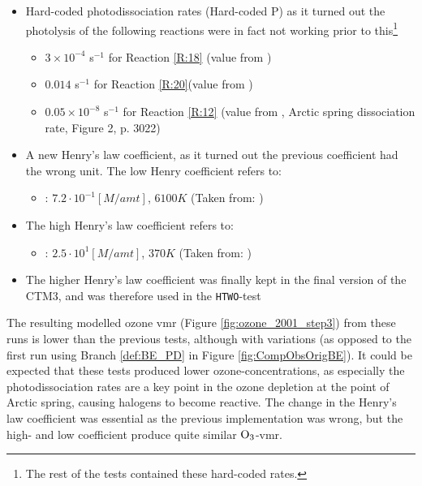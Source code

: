 \begin{itemize}
    \item Hard-coded photodissociation rates (Hard-coded P) as it turned out the photolysis of the following reactions were in fact not working prior to this\footnote{The rest of the tests contained these hard-coded rates. }
    \begin{itemize}
        \item $3\times10^{-4}$ s$^{-1}$ for Reaction \ref{R:18} (value from \cite{CAO})
        \item $0.014$ s$^{-1}$ for Reaction \ref{R:20}(value from \cite{CAO})
        \item $0.05\times10^{-8}$ s$^{-1}$ for Reaction \ref{R:12} (value from \cite{Papanastasiou2013}, Arctic spring dissociation rate, Figure 2, p. 3022)
    \end{itemize}
    
    \item A new Henry's law coefficient, as it turned out the previous coefficient had the wrong unit. The low Henry coefficient refers to:
    \begin{itemize}
        \item {}: $7.2\cdot 10^{-1} [M/amt]$, $6100 K$ (Taken from: \cite{Chameides1992})
    \end{itemize}   
    \item The high Henry's law coefficient refers to: 
    \begin{itemize}
        \item {}: $2.5 \cdot 10^{1} [M/amt]$, $370 K$ (Taken from: \cite{dean1999})
    \end{itemize}
    \item The higher Henry's law coefficient was finally kept in the final version of the CTM3, and was therefore used in the \texttt{HTWO}-test
\end{itemize}

The resulting modelled ozone \acrshort{vmr} (Figure \ref{fig:ozone_2001_step3}) from these runs is lower than the previous tests, although with variations (as opposed to the first run using Branch \ref{def:BE_PD} in Figure \ref{fig:CompObsOrigBE}). It could be expected that these tests produced lower ozone-concentrations, as especially the photodissociation rates are a key point in the ozone depletion at the point of Arctic spring, causing halogens to become reactive. The change in the Henry's law coefficient was essential as the previous implementation was wrong, but the high- and low coefficient produce quite similar $\mathrm{O_3}$-\acrshort{vmr}. 


